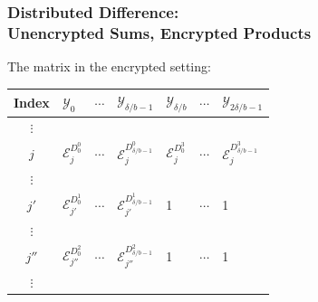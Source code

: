 \documentclass{beamer}
\makeatletter
\DeclareRobustCommand*{\&}{%
  \nfss@text{%
    \fontfamily{LinuxBiolinumT-TLF}%
    \selectfont
    \symbol{`\&}%
  }%
}
\makeatother
\begin{document}
\begin{frame}
  \frametitle{Distributed Difference:\\ Unencrypted Sums, Encrypted Products}
  The matrix in the encrypted setting:
  \begin{center}
  \begin{tabular}{c  C{1.35cm}  c  C{1.35cm}  C{1.35cm}  c  C{1.35cm}  }
     {\scriptsize Index}             & $\mathcal{Y}_0$\qquad            & $\cdots$\qquad         & $\mathcal{Y}_{\delta/b-1}$\qquad & $\mathcal{Y}_{\delta/b}$\qquad   & $\cdots$\qquad         & $\mathcal{Y}_{2\delta/b-1}$\qquad\\\toprule
     $\vdots$ & \\
     {\footnotesize$j$} & {\footnotesize $\mathcal{E}_j^{D^0_0}$} & $\cdots$ & {\footnotesize $\mathcal{E}_j^{D^0_{\delta/b-1}}$}                      & {\footnotesize $\mathcal{E}_j^{D^3_0}$}                         & $\cdots$ & {\footnotesize $\mathcal{E}_j^{D^3_{\delta/b-1}}$}                         \\
     $\vdots$ & \\
     {\footnotesize$j'$}  & {\footnotesize $\mathcal{E}_{j'}^{D^1_0}$} & $\cdots$                           & {\footnotesize $\mathcal{E}_{j'}^{D^1_{\delta/b-1}}$}                           & 1                      & $\cdots$                           & 1\\
     $\vdots$ & \\
     {\footnotesize$j''$}  & {\footnotesize $\mathcal{E}_{j''}^{D^2_0}$} & $\cdots$                           & {\footnotesize $\mathcal{E}_{j''}^{D^2_{\delta/b-1}}$}                           & 1                      & $\cdots$                           & 1\\
     $\vdots$ & \\\bottomrule
  \end{tabular}
  \end{center}
\end{frame}
\end{document}
